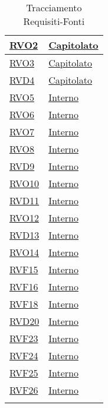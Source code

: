 \begin{longtable}{|>{\centering}m{5cm}|m{5cm}<{\centering}|}
\hyperlink{RVO2}{RVO2} & \hyperlink{Capitolato}{Capitolato}\\ \hline

\hyperlink{RVO3}{RVO3} & \hyperlink{Capitolato}{Capitolato}\\ \hline

\hyperlink{RVD4}{RVD4} & \hyperlink{Capitolato}{Capitolato}\\ \hline

\hyperlink{RVO5}{RVO5} & \hyperlink{Interno}{Interno}\\ \hline

\hyperlink{RVO6}{RVO6} & \hyperlink{Interno}{Interno}\\ \hline

\hyperlink{RVO7}{RVO7} & \hyperlink{Interno}{Interno}\\ \hline

\hyperlink{RVO8}{RVO8} & \hyperlink{Interno}{Interno}\\ \hline

\hyperlink{RVD9}{RVD9} & \hyperlink{Interno}{Interno}\\ \hline

\hyperlink{RVO10}{RVO10} & \hyperlink{Interno}{Interno}\\ \hline

\hyperlink{RVD11}{RVD11} & \hyperlink{Interno}{Interno}\\ \hline

\hyperlink{RVO12}{RVO12} & \hyperlink{Interno}{Interno}\\ \hline

\hyperlink{RVD13}{RVD13} & \hyperlink{Interno}{Interno}\\ \hline

\hyperlink{RVO14}{RVO14} & \hyperlink{Interno}{Interno}\\ \hline

\hyperlink{RVF15}{RVF15} & \hyperlink{Interno}{Interno}\\ \hline

\hyperlink{RVF16}{RVF16} & \hyperlink{Interno}{Interno}\\ \hline

\hyperlink{RVF18}{RVF18} & \hyperlink{Interno}{Interno}\\ \hline

\hyperlink{RVD20}{RVD20} & \hyperlink{Interno}{Interno}\\ \hline

\hyperlink{RVF23}{RVF23} & \hyperlink{Interno}{Interno}\\ \hline

\hyperlink{RVF24}{RVF24} & \hyperlink{Interno}{Interno}\\ \hline

\hyperlink{RVF25}{RVF25} & \hyperlink{Interno}{Interno}\\ \hline

\hyperlink{RVF26}{RVF26} & \hyperlink{Interno}{Interno}\\ \hline

\caption[Tracciamento Requisiti-Fonti]{Tracciamento Requisiti-Fonti}
\label{tabella:requi-fonti}
\end{longtable}
\clearpage
